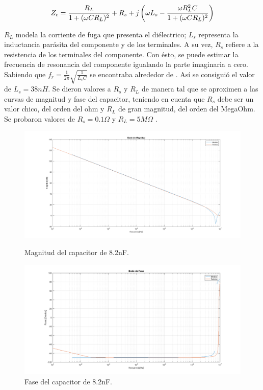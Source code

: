 \begin{equation}
\centering
Z_c=\frac{R_L}{1+(\omega CR_L)^2}+R_s+j\left(\omega L_s-\frac{\omega R_L^2C}{1+(\omega CR_L)^2}\right)
\end{equation}

$R_L$ modela la corriente de fuga que presenta el diélectrico; $L_s$ representa la inductancia parásita del componente y de los terminales. A su vez, $R_s$ refiere a la resistencia de los terminales del componente.
Con ésto, se puede estimar la frecuencia de resonancia del componente igualando la parte imaginaria a cero. Sabiendo que $f_r=\frac{1}{2\pi}\sqrt{\frac{1}{L_sC}}$ se encontraba alrededor de . Así se consiguió el valor de $L_s=38nH$. 
Se dieron valores a $R_s$ y $R_L$ de manera tal que se aproximen a las curvas de magnitud y fase del capacitor, teniendo en cuenta que $R_s$ debe ser un valor chico, del orden del ohm y $R_L$ de gran magnitud, del orden del MegaOhm. Se probaron valores de $R_s=0.1\Omega$ y $R_L=5M\Omega$ .

\begin{figure}[H]
\centering
\includegraphics[scale=0.3]{Cmag.png}
\caption{Magnitud del capacitor de 8.2nF.}
\label{fig:cmag}
\includegraphics[scale=0.3]{Cfase.png}
\caption{Fase del capacitor de 8.2nF.}
\label{fig:cfase}
\end{figure}

